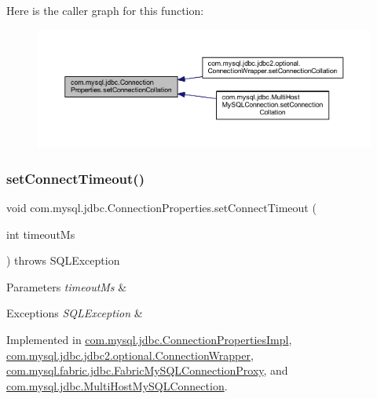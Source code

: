Here is the caller graph for this function\+:\nopagebreak
\begin{figure}[H]
\begin{center}
\leavevmode
\includegraphics[width=350pt]{interfacecom_1_1mysql_1_1jdbc_1_1_connection_properties_a69729667beed7cc9989d0b736d2cc28d_icgraph}
\end{center}
\end{figure}
\mbox{\label{interfacecom_1_1mysql_1_1jdbc_1_1_connection_properties_af58263721d45c09ec3bdbccc1041e1df}} 
\subsubsection{\texorpdfstring{set\+Connect\+Timeout()}{setConnectTimeout()}}
{\footnotesize\ttfamily void com.\+mysql.\+jdbc.\+Connection\+Properties.\+set\+Connect\+Timeout (\begin{DoxyParamCaption}\item[{int}]{timeout\+Ms }\end{DoxyParamCaption}) throws S\+Q\+L\+Exception}


\begin{DoxyParams}{Parameters}
{\em timeout\+Ms} & \\
\hline
\end{DoxyParams}

\begin{DoxyExceptions}{Exceptions}
{\em S\+Q\+L\+Exception} & \\
\hline
\end{DoxyExceptions}


Implemented in \mbox{\hyperlink{classcom_1_1mysql_1_1jdbc_1_1_connection_properties_impl_a216dd4e1be4e43e51b99f33f3ff86ae9}{com.\+mysql.\+jdbc.\+Connection\+Properties\+Impl}}, \mbox{\hyperlink{classcom_1_1mysql_1_1jdbc_1_1jdbc2_1_1optional_1_1_connection_wrapper_aba78fb901b9a9d79b7432393b49febf0}{com.\+mysql.\+jdbc.\+jdbc2.\+optional.\+Connection\+Wrapper}}, \mbox{\hyperlink{classcom_1_1mysql_1_1fabric_1_1jdbc_1_1_fabric_my_s_q_l_connection_proxy_a633f93709b9605c9a756c4dce2985c6c}{com.\+mysql.\+fabric.\+jdbc.\+Fabric\+My\+S\+Q\+L\+Connection\+Proxy}}, and \mbox{\hyperlink{classcom_1_1mysql_1_1jdbc_1_1_multi_host_my_s_q_l_connection_ae1ddb08eaad091d37ab698280efcd668}{com.\+mysql.\+jdbc.\+Multi\+Host\+My\+S\+Q\+L\+Connection}}.

